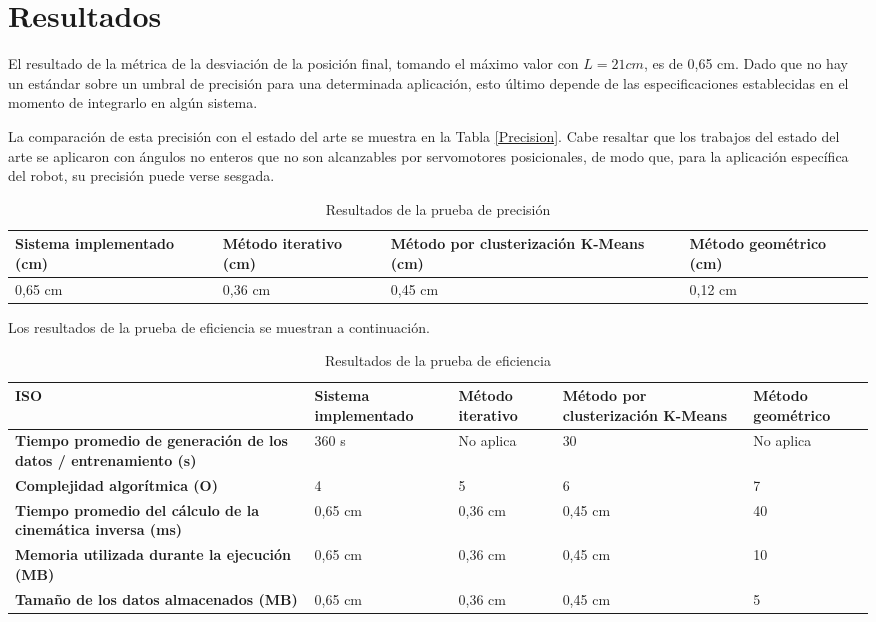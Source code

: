 \section{Resultados}

El resultado de la métrica de la desviación de la posición final, tomando el máximo valor con $L = 21 cm$, es de 0,65 cm. Dado que no hay un estándar sobre un umbral de precisión para una determinada aplicación, esto último depende de las especificaciones establecidas en el momento de integrarlo en algún sistema.

La comparación de esta precisión con el estado del arte se muestra en la Tabla \ref{Precision}. Cabe resaltar que los trabajos del estado del arte se aplicaron con ángulos no enteros que no son alcanzables por servomotores posicionales, de modo que, para la aplicación específica del robot, su precisión puede verse sesgada.

\begin{table}[ht]
	\centering
	\begin{tabular}{p{5cm}p{4cm}p{3.6cm}p{4cm}}
		\hline
		\textbf{Sistema implementado (cm)} & \textbf{Método iterativo (cm)} & \textbf{Método por clusterización K-Means (cm)} & \textbf{Método geométrico (cm)} \\
		\hline
		0,65 cm & 0,36 cm & 0,45 cm & 0,12 cm \\
		\hline
	\end{tabular}
	\caption{Resultados de la prueba de precisión}
	\label{tab:Precision}
\end{table}

Los resultados de la prueba de eficiencia se muestran a continuación.

\begin{table}[ht]
	\centering
	\begin{tabular}{p{3.2cm}p{3.2cm}p{3.2cm}p{3.2cm}p{3.2cm}}
		\hline
	    \textbf{ISO} & \textbf{Sistema implementado} & \textbf{Método iterativo} & \textbf{Método por clusterización K-Means} & \textbf{Método geométrico} \\
		\hline
		\textbf{Tiempo promedio de generación de los datos / entrenamiento (s)} & 360 s & No aplica & 30 & No aplica \\
		\textbf{Complejidad algorítmica (O)} & 4 & 5 & 6 & 7 \\
		\textbf{Tiempo promedio del cálculo de la cinemática inversa (ms)} & 0,65 cm & 0,36 cm & 0,45 cm & 40 \\
		\textbf{Memoria utilizada durante la ejecución (MB)} & 0,65 cm & 0,36 cm & 0,45 cm & 10 \\
		\textbf{Tamaño de los datos almacenados (MB)} & 0,65 cm & 0,36 cm & 0,45 cm & 5 \\
		\hline
	\end{tabular}
	\caption{Resultados de la prueba de eficiencia}
	\label{tab:Precision}
\end{table}
